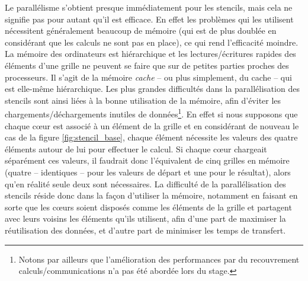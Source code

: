 Le parallélisme s'obtient presque immédiatement pour les stencils, mais cela ne signifie pas pour autant qu'il est efficace. En effet les problèmes qui les utilisent nécessitent généralement beaucoup de mémoire (qui est de plus doublée en considérant que les calculs ne sont pas en place), ce qui rend l'efficacité moindre. La mémoire des ordinateurs est hiérarchique et les lectures/écritures rapides des éléments d'une grille ne peuvent se faire que sur de petites parties proches des processeurs. Il s'agit de la mémoire \emph{cache} -- ou plus simplement, du cache -- qui est elle-même hiérarchique. Les plus grandes difficultés dans la parallélisation des stencils sont ainsi liées à la bonne utilisation de la mémoire, afin d'éviter les chargements/déchargements inutiles de données\footnote{Notons par ailleurs que l'amélioration des performances par du recouvrement calculs/communications n'a pas été abordée lors du stage.}. En effet si nous supposons que chaque cœur est associé à un élément de la grille et en considérant de nouveau le cas de la figure \ref{fig:stencil_base}, chaque élément nécessite les valeurs des quatre éléments autour de lui pour effectuer le calcul. Si chaque cœur chargeait séparément ces valeurs, il faudrait donc l'équivalent de cinq grilles en mémoire (quatre -- identiques -- pour les valeurs de départ et une pour le résultat), alors qu'en réalité seule deux sont nécessaires. La difficulté de la parallélisation des stencils réside donc dans la façon d'utiliser la mémoire, notamment en faisant en sorte que les cœurs soient disposés comme les éléments de la grille et partagent avec leurs voisins les éléments qu'ils utilisent, afin d'une part de maximiser la réutilisation des données, et d'autre part de minimiser les temps de transfert.

